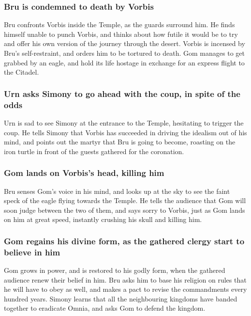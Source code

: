 \subsubsection{\Gls{Bru} is condemned to death by \Gls{Vorbis}}
\Gls{Bru} confronts \Gls{Vorbis} inside the Temple, as the guards surround him. He finds himself
unable to punch \Gls{Vorbis}, and thinks about how futile it would be to try and offer his own
version of the journey through the desert. \Gls{Vorbis} is incensed by \Gls{Bru}'s self-restraint,
and orders him to be tortured to death. \Gls{Gom} manages to get grabbed by an eagle, and hold its
life hostage in exchange for an express flight to the Citadel.

\subsubsection{\Gls{Urn} asks \Gls{Simony} to go ahead with the coup, in spite of the odds}
\Gls{Urn} is sad to see \Gls{Simony} at the entrance to the Temple, hesitating to trigger the coup.
He tells \Gls{Simony} that \Gls{Vorbis} has succeeded in driving the idealism out of his mind, and
points out the martyr that \Gls{Bru} is going to become, roasting on the iron turtle in front of
the guests gathered for the coronation.

\subsubsection{\Gls{Gom} lands on \Gls{Vorbis}'s head, killing him}
\Gls{Bru} senses \Gls{Gom}'s voice in his mind, and looks up at the sky to see the faint speck of
the eagle flying towards the Temple. He tells the audience that \Gls{Gom} will soon judge between
the two of them, and says sorry to \Gls{Vorbis}, just as \Gls{Gom} lands on him at great speed,
instantly crushing his skull and killing him.

\subsubsection{\Gls{Gom} regains his divine form, as the gathered clergy start to believe in him}
\Gls{Gom} grows in power, and is restored to his godly form, when the gathered audience renew their
belief in him. \Gls{Bru} asks him to base his religion on rules that he will have to obey as well,
and makes a pact to revise the commandments every hundred years. \Gls{Simony} learns that all the
neighbouring kingdoms have banded together to eradicate Omnia, and asks \Gls{Gom} to defend the
kingdom.

